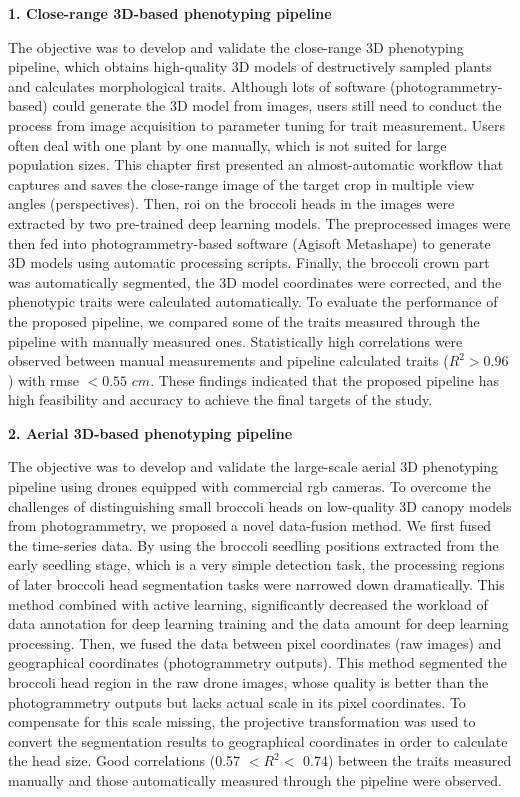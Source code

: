 \begin{doublespace}
\noindent
\textbf{1. Close-range 3D-based phenotyping pipeline}

The objective was to develop and validate the close-range 3D phenotyping pipeline, which obtains high-quality 3D models of destructively sampled plants and calculates morphological traits. Although lots of software (photogrammetry-based) could generate the 3D model from images, users still need to conduct the process from image acquisition to parameter tuning for trait measurement. Users often deal with one plant by one manually, which is not suited for large population sizes. This chapter first presented an almost-automatic workflow that captures and saves the close-range image of the target crop in multiple view angles (perspectives). Then, \gls{roi} on the broccoli heads in the images were extracted by two pre-trained deep learning models. The preprocessed images were then fed into photogrammetry-based software (Agisoft Metashape) to generate 3D models using automatic processing scripts. Finally, the broccoli crown part was automatically segmented, the 3D model coordinates were corrected, and the phenotypic traits were calculated automatically. To evaluate the performance of the proposed pipeline, we compared some of the traits measured through the pipeline with manually measured ones. Statistically high correlations were observed between manual measurements and pipeline calculated traits ($R^2>0.96$) with \gls{rmse} $< 0.55$ $cm$. These findings indicated that the proposed pipeline has high feasibility and accuracy to achieve the final targets of the study.

\vspace{5mm}
\noindent
\textbf{2. Aerial 3D-based phenotyping pipeline}

The objective was to develop and validate the large-scale aerial 3D phenotyping pipeline using drones equipped with commercial \gls{rgb} cameras. To overcome the challenges of distinguishing small broccoli heads on low-quality 3D canopy models from photogrammetry, we proposed a novel data-fusion method. We first fused the time-series data. By using the broccoli seedling positions extracted from the early seedling stage, which is a very simple detection task, the processing regions of later broccoli head segmentation tasks were narrowed down dramatically. This method combined with active learning, significantly decreased the workload of data annotation for deep learning training and the data amount for deep learning processing. Then, we fused the data between pixel coordinates (raw images) and geographical coordinates (photogrammetry outputs). This method segmented the broccoli head region in the raw drone images, whose quality is better than the photogrammetry outputs but lacks actual scale in its pixel coordinates. To compensate for this scale missing, the projective transformation was used to convert the segmentation results to geographical coordinates in order to calculate the head size. Good correlations (0.57 $<R^2<$ 0.74) between the traits measured manually and those automatically measured through the pipeline were observed.


\end{doublespace}
